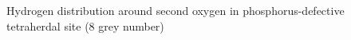 \begin{figure}[h!]
\begin{minipage}[h]{0.5\linewidth}
\end{minipage}
\hfill
\begin{minipage}[h]{0.5\linewidth}
\end{minipage}
\caption{Hydrogen distribution around second oxygen in phosphorus-defective tetraherdal site (8 grey number)}
\label{HinO1and2}
\end{figure}

